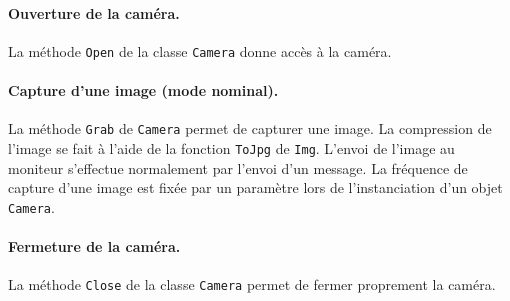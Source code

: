 \paragraph{Ouverture de la caméra.} La méthode {\tt Open} de la classe {\tt Camera} donne accès à la caméra.\\


\paragraph{Capture d'une image (mode nominal).} La méthode {\tt Grab} de {\tt Camera} permet de capturer une image. La compression de l'image se fait à l'aide de la fonction {\tt ToJpg} de {\tt Img}. L'envoi de l'image au moniteur s'effectue normalement par l'envoi d'un message. La fréquence de capture d'une image est fixée par un paramètre lors de l'instanciation d'un objet {\tt Camera}.\\


\paragraph{Fermeture de la caméra.} La méthode {\tt Close} de la classe {\tt Camera} permet de fermer proprement la caméra.\\



